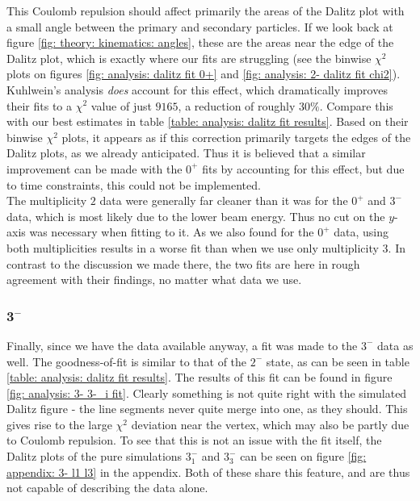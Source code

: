 This Coulomb repulsion should affect primarily the areas of the Dalitz plot with a small angle between the primary and secondary particles. If we look back at figure \ref{fig: theory: kinematics: angles}, these are the areas near the edge of the Dalitz plot, which is exactly where our fits are struggling (see the binwise $\chi^2$ plots on figures \ref{fig: analysis: dalitz fit 0+} and \ref{fig: analysis: 2- dalitz fit chi2}). Kuhlwein's analysis \textit{does} account for this effect, which dramatically improves their fits to a $\chi^2$ value of just $9165$, a reduction of roughly $30\%$. Compare this with our best estimates in table \ref{table: analysis: dalitz fit results}. Based on their binwise $\chi^2$ plots, it appears as if this correction primarily targets the edges of the Dalitz plots, as we already anticipated. Thus it is believed that a similar improvement can be made with the $0^+$ fits by accounting for this effect, but due to time constraints, this could not be implemented. \\

The multiplicity $2$ data were generally far cleaner than it was for the $0^+$ and $3^-$ data, which is most likely due to the lower beam energy. Thus no cut on the $y$-axis was necessary when fitting to it. As we also found for the $0^+$ data, using both multiplicities results in a worse fit than when we use only multiplicity $3$. In contrast to the discussion we made there, the two fits are here in rough agreement with their findings, no matter what data we use. 

\subsubsection{$\bm{3^-}$}
Finally, since we have the data available anyway, a fit was made to the $3^-$ data as well. The goodness-of-fit is similar to that of the $2^-$ state, as can be seen in table \ref{table: analysis: dalitz fit results}. The results of this fit can be found in figure \ref{fig: analysis: 3- 3-_i fit}. Clearly something is not quite right with the simulated Dalitz figure - the line segments never quite merge into one, as they should. This gives rise to the large $\chi^2$ deviation near the vertex, which may also be partly due to Coulomb repulsion. To see that this is not an issue with the fit itself, the Dalitz plots of the pure simulations $3^-_1$ and $3^-_3$ can be seen on figure \ref{fig: appendix: 3- l1 l3} in the appendix. Both of these share this feature, and are thus not capable of describing the data alone. \\

